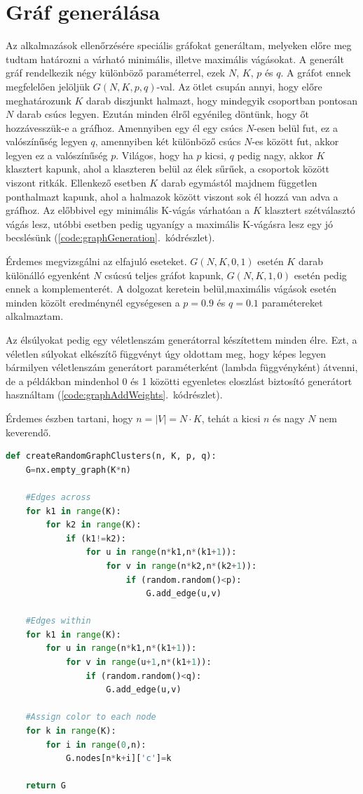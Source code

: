 \section{Gráf generálása}\label{sec:graphGeneration}
Az alkalmazások ellenőrzésére speciális gráfokat generáltam, melyeken előre meg tudtam határozni a várható minimális, illetve maximális vágásokat. A generált gráf rendelkezik négy különböző paraméterrel, ezek $N$, $K$, $p$ és $q$. A gráfot ennek megfelelően jelöljük $G(N,K,p,q)$-val.
Az ötlet csupán annyi, hogy előre meghatározunk $K$ darab diszjunkt halmazt, hogy mindegyik csoportban pontosan $N$ darab csúcs legyen. Ezután minden élről egyénileg döntünk, hogy őt hozzávesszük-e a gráfhoz. Amennyiben egy él egy csúcs $N$-esen belül fut, ez a valószínűség legyen $q$, amennyiben két különböző csúcs $N$-es között fut, akkor legyen ez a valószínűség $p$. Világos, hogy ha $p$ kicsi, $q$ pedig nagy, akkor $K$ klasztert kapunk, ahol a klaszteren belül az élek sűrűek, a csoportok között viszont ritkák. Ellenkező esetben $K$ darab egymástól majdnem független ponthalmazt kapunk, ahol a halmazok között viszont sok él hozzá van adva a gráfhoz. Az előbbivel egy minimális K-vágás várhatóan a $K$ klasztert szétválasztó vágás lesz, utóbbi esetben pedig ugyanígy a maximális K-vágásra lesz egy jó becslésünk (\ref{code:graphGeneration}.~kódrészlet). 

Érdemes megvizsgálni az elfajuló eseteket. $G(N,K,0,1)$ esetén $K$ darab különálló egyenként $N$ csúcsú teljes gráfot kapunk, $G(N,K,1,0)$ esetén pedig ennek a komplementerét. A dolgozat keretein belül,maximális vágások esetén minden közölt eredménynél egységesen a $p=0.9$ és $q=0.1$ paramétereket alkalmaztam.

Az élsúlyokat pedig egy véletlenszám generátorral készítettem minden élre. Ezt, a véletlen súlyokat elkészítő függvényt úgy oldottam meg, hogy képes legyen bármilyen véletlenszám generátort paraméterként (lambda függvényként) átvenni, de a példákban mindenhol 0 és 1 közötti egyenletes eloszlást biztosító generátort használtam (\ref{code:graphAddWeights}.~kódrészlet).

Érdemes észben tartani, hogy $n=|V|=N \cdot K$, tehát a kicsi $n$ és nagy $N$ nem keverendő.

\begin{lstlisting}[language=python,caption=Gráf generálása,label=code:graphGeneration]	
def createRandomGraphClusters(n, K, p, q):
	G=nx.empty_graph(K*n)
	
	#Edges across
	for k1 in range(K):
		for k2 in range(K):
			if (k1!=k2):
				for u in range(n*k1,n*(k1+1)):
					for v in range(n*k2,n*(k2+1)):
						if (random.random()<p):
							G.add_edge(u,v)
	
	#Edges within
	for k1 in range(K):
		for u in range(n*k1,n*(k1+1)):
			for v in range(u+1,n*(k1+1)):
				if (random.random()<q):
					G.add_edge(u,v)
	
	#Assign color to each node
	for k in range(K):
		for i in range(0,n):
			G.nodes[n*k+i]['c']=k
	
	return G
	
\end{lstlisting}

